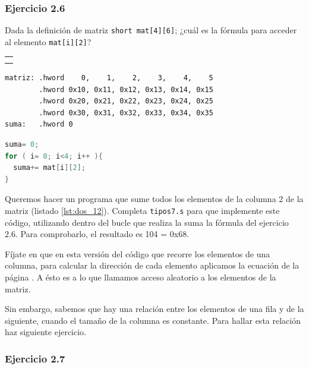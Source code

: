 \subsubsection{Ejercicio 2.6}
Dada la definición de matriz {\tt short mat[4][6]}; ¿cuál es la
fórmula para acceder al elemento {\tt mat[i][2]}?

\begin{center}
\colorbox[gray]{0.9}{
\small
\begin{tabular}{c}
\\
\begin{minipage}{0.9\linewidth}
\colorbox[gray]{1}{\rule{0cm}{0.6cm}\rule{11cm}{0cm}}\\
\end{minipage} \\
\end{tabular}
\vspace{0.5ex}
}
\end{center}


\begin{lstlisting}[caption={Matrices},label={lst:dos_12}]
matriz: .hword    0,    1,    2,    3,    4,    5
        .hword 0x10, 0x11, 0x12, 0x13, 0x14, 0x15
        .hword 0x20, 0x21, 0x22, 0x23, 0x24, 0x25
        .hword 0x30, 0x31, 0x32, 0x33, 0x34, 0x35
suma:   .hword 0
\end{lstlisting}

\begin{lstlisting}[language=C]
suma= 0; 
for ( i= 0; i<4; i++ ){
  suma+= mat[i][2];
}
\end{lstlisting}

Queremos hacer un programa que sume todos los elementos de la columna
2 de la matriz (listado \ref{lst:dos_12}). Completa {\tt tipos7.s} para
que implemente este código, utilizando dentro del bucle que realiza la
suma la fórmula del ejercicio 2.6. Para comprobarlo, el resultado
es 104 = 0x68.

Fíjate en que en esta versión del código que recorre los elementos de
una columna,  para calcular la dirección de cada elemento aplicamos la
ecuación de la página \pageref{eq:accesoelemmatriz}. A ésto es a lo que llamamos
acceso aleatorio a los elementos de la matriz. 

Sin embargo, sabemos que hay una relación entre los elementos de una
fila y de la siguiente, cuando el tamaño de la columna es
constante. Para hallar esta relación haz siguiente ejercicio.

\subsubsection{Ejercicio 2.7}

